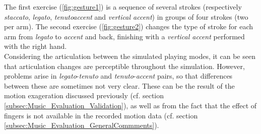 The first exercise (\myfigname \ref{fig:gesture1}) is a sequence of several strokes (respectively \emph{staccato}, \emph{legato}, \emph{tenuto}\emph{accent} and \emph{vertical accent}) in groups of four strokes (two per arm). The second exercise (\myfigname \ref{fig:gesture2}) changes the type of stroke for each arm from \emph{legato} to \emph{accent} and back, finishing with a \emph{vertical accent} performed with the right hand.\\
		
Considering the articulation between the simulated playing modes, it can be seen that articulation changes are perceptible throughout the simulation. However, problems arise in \emph{legato}-\emph{tenuto} and \emph{tenuto}-\emph{accent} pairs, so that differences between these are sometimes not very clear. These can be the result of the motion exageration discussed previously (cf. section \ref{subsec:Music_Evaluation_Validation}), as well as from the fact that the effect of fingers is not available in the recorded motion data (cf. section \ref{subsec:Music_Evaluation_GeneralCommments}).





